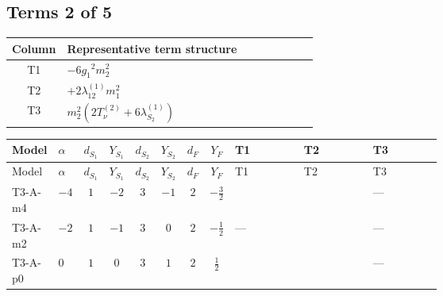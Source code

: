 \documentclass[8pt]{article}
\begin{document}
\begin{landscape}
\subsection*{Terms 2 of 5}
\begin{center}
\begin{tabular}{@{}c >{\raggedright\arraybackslash}p{0.82\linewidth}@{}}
\toprule
Column & Representative term structure \\
\midrule
T1 & \(\displaystyle -6 {g_1}^2 {m_2^2}\) \\
\midrule
T2 & \(\displaystyle +2 {\lambda_{12}^{(1)}} {m_1^2}\) \\
\midrule
T3 & \(\displaystyle {m_2^2} (2 T_{\nu}^{(2)}+6 {\lambda_{S_2}^{(1)}})\) \\
\midrule
\bottomrule
\end{tabular}
\end{center}
\smallskip
\tiny
\begin{longtable}{@{}llcccccc >{\raggedright\arraybackslash}p{0.21\linewidth} >{\raggedright\arraybackslash}p{0.21\linewidth} >{\raggedright\arraybackslash}p{0.21\linewidth}@{}}
\toprule
Model & $\alpha$ & $d_{S_1}$ & $Y_{S_1}$ & $d_{S_2}$ & $Y_{S_2}$ & $d_F$ & $Y_F$ & T1 & T2 & T3 \\
\midrule
\endfirsthead
\toprule
Model & $\alpha$ & $d_{S_1}$ & $Y_{S_1}$ & $d_{S_2}$ & $Y_{S_2}$ & $d_F$ & $Y_F$ & T1 & T2 & T3 \\
\midrule
\endhead
T3-A-m4 & $-4$ & $1$ & $-2$ & $3$ & $-1$ & $2$ & $-\frac{3}{2}$ & \scriptsize\adjustbox{max width=\linewidth}{$\begin{gathered} -6 {g_1}^2 {m_2^2}\end{gathered}$} & \scriptsize\adjustbox{max width=\linewidth}{$\begin{gathered} +2 {\lambda_{12}^{(1)}} {m_1^2}\end{gathered}$} & --- \\
\midrule
T3-A-m2 & $-2$ & $1$ & $-1$ & $3$ & $0$ & $2$ & $-\frac{1}{2}$ & --- & \scriptsize\adjustbox{max width=\linewidth}{$\begin{gathered} +2 {\lambda_{12}^{(1)}} {m_1^2}\end{gathered}$} & --- \\
\midrule
T3-A-p0 & $0$ & $1$ & $0$ & $3$ & $1$ & $2$ & $\frac{1}{2}$ & \scriptsize\adjustbox{max width=\linewidth}{$\begin{gathered} -6 {g_1}^2 {m_2^2}\end{gathered}$} & \scriptsize\adjustbox{max width=\linewidth}{$\begin{gathered} +2 {\lambda_{12}^{(1)}} {m_1^2}\end{gathered}$} & --- \\

\end{longtable}
\end{landscape}
\end{document}
